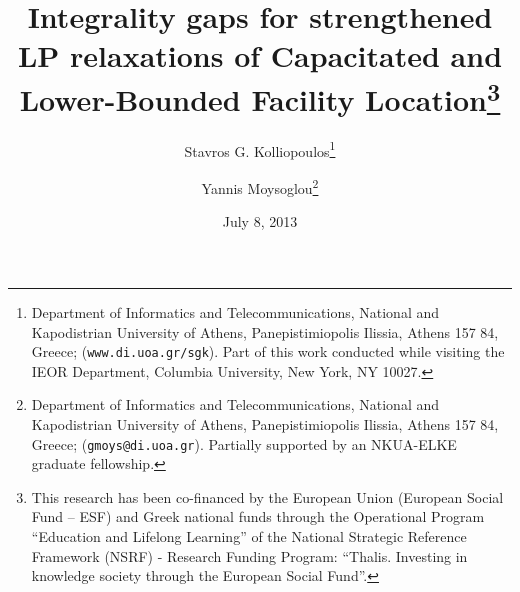 \documentclass[11pt]{article}\usepackage{amsmath}
\date{}
\begin{document}
\title{
Integrality gaps for strengthened LP relaxations of Capacitated
and Lower-Bounded Facility Location\thanks{
This research has been co-financed by the European Union (European
Social Fund -- ESF) and Greek national funds through the Operational
Program ``Education and Lifelong Learning'' of the National Strategic
Reference Framework (NSRF) - Research Funding Program:
``Thalis. Investing in knowledge society through the European Social Fund''.}
}

\author {Stavros G. Kolliopoulos\thanks{Department of Informatics and
Telecommunications, National and Kapodistrian 
University of Athens, Panepistimiopolis Ilissia, Athens
157 84, Greece; (\texttt{www.di.uoa.gr/}\~{\tt sgk}). Part of this
work conducted while visiting the 
  IEOR Department, Columbia University, New York, NY 10027.}   
\and Yannis Moysoglou\thanks{ Department of Informatics and
Telecommunications, National and Kapodistrian 
University of Athens, Panepistimiopolis Ilissia, Athens
157 84, Greece; (\texttt{gmoys@di.uoa.gr}). Partially supported by an
NKUA-ELKE graduate fellowship.} }


\date{July 8, 2013}

\maketitle


\thispagestyle{empty}
\end{document}
